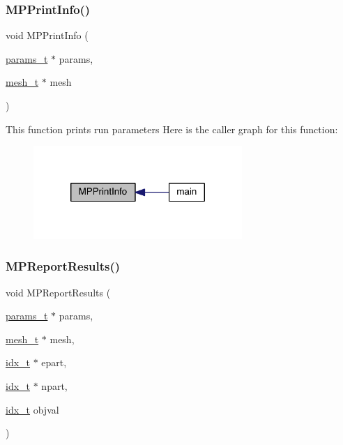 \subsubsection{\texorpdfstring{M\+P\+Print\+Info()}{MPPrintInfo()}}
{\footnotesize\ttfamily void M\+P\+Print\+Info (\begin{DoxyParamCaption}\item[{\hyperlink{a00706}{params\+\_\+t} $\ast$}]{params,  }\item[{\hyperlink{a00738}{mesh\+\_\+t} $\ast$}]{mesh }\end{DoxyParamCaption})}

This function prints run parameters Here is the caller graph for this function\+:\nopagebreak
\begin{figure}[H]
\begin{center}
\leavevmode
\includegraphics[width=224pt]{a00948_a921bb5a29825f90d7095365cc3e92bdc_icgraph}
\end{center}
\end{figure}
\mbox{\label{a00948_a236149f75cde8a4272e20cdcad0b9db2}} 
\subsubsection{\texorpdfstring{M\+P\+Report\+Results()}{MPReportResults()}}
{\footnotesize\ttfamily void M\+P\+Report\+Results (\begin{DoxyParamCaption}\item[{\hyperlink{a00706}{params\+\_\+t} $\ast$}]{params,  }\item[{\hyperlink{a00738}{mesh\+\_\+t} $\ast$}]{mesh,  }\item[{\hyperlink{a00876_aaa5262be3e700770163401acb0150f52}{idx\+\_\+t} $\ast$}]{epart,  }\item[{\hyperlink{a00876_aaa5262be3e700770163401acb0150f52}{idx\+\_\+t} $\ast$}]{npart,  }\item[{\hyperlink{a00876_aaa5262be3e700770163401acb0150f52}{idx\+\_\+t}}]{objval }\end{DoxyParamCaption})}

